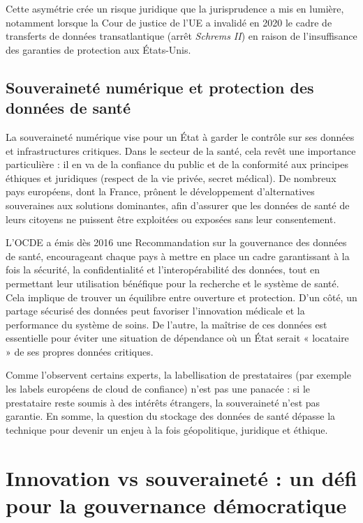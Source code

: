 \documentclass[10pt,a4paper]{article} %
\begin{document}
Cette asymétrie crée un risque juridique que la jurisprudence a mis en lumière, notamment lorsque la Cour de justice de l’UE a invalidé en 2020 le cadre de transferts de données transatlantique (arrêt \textit{Schrems II}) en raison de l’insuffisance des garanties de protection aux États-Unis.

\subsection{Souveraineté numérique et protection des données de santé}

La souveraineté numérique vise pour un État à garder le contrôle sur ses données et infrastructures critiques. Dans le secteur de la santé, cela revêt une importance particulière : il en va de la confiance du public et de la conformité aux principes éthiques et juridiques (respect de la vie privée, secret médical). De nombreux pays européens, dont la France, prônent le développement d’alternatives souveraines aux solutions dominantes, afin d’assurer que les données de santé de leurs citoyens ne puissent être exploitées ou exposées sans leur consentement.

L’OCDE a émis dès 2016 une Recommandation sur la gouvernance des données de santé, encourageant chaque pays à mettre en place un cadre garantissant à la fois la sécurité, la confidentialité et l’interopérabilité des données, tout en permettant leur utilisation bénéfique pour la recherche et le système de santé. Cela implique de trouver un équilibre entre ouverture et protection. D’un côté, un partage sécurisé des données peut favoriser l’innovation médicale et la performance du système de soins. De l’autre, la maîtrise de ces données est essentielle pour éviter une situation de dépendance où un État serait « locataire » de ses propres données critiques.

Comme l’observent certains experts, la labellisation de prestataires (par exemple les labels européens de cloud de confiance) n’est pas une panacée : si le prestataire reste soumis à des intérêts étrangers, la souveraineté n’est pas garantie. En somme, la question du stockage des données de santé dépasse la technique pour devenir un enjeu à la fois géopolitique, juridique et éthique.

\section{Innovation vs souveraineté : un défi pour la gouvernance démocratique}
\end{document}

